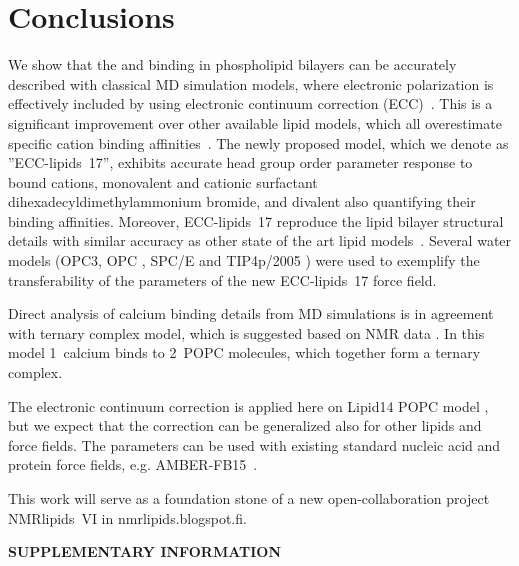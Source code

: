 \documentclass[aip,jcp,twocolumn]{revtex4}
\begin{document}
\section{Conclusions}
We show that the  and  binding in phospholipid bilayers can
be accurately described with classical MD simulation models, where electronic
polarization is effectively included by using electronic continuum correction (ECC)~\cite{leontyev11}.
This is a significant improvement over other available lipid models,
which all overestimate specific cation binding affinities~\cite{catte16}.  
The newly proposed model, which we denote as ''ECC-lipids~17'', 
exhibits accurate head group order parameter response to
bound cations, monovalent  and cationic surfactant dihexadecyldimethylammonium bromide, 
and divalent 
also quantifying their binding affinities.
Moreover, ECC-lipids~17 reproduce the lipid bilayer structural details
with similar accuracy as other state of the art lipid models~\cite{catte16}.
Several water models 
(OPC3\cite{Izadi16}, OPC \cite{Izadi14}, SPC/E \cite{Berendsen1987} and TIP4p/2005 \cite{Abascal2005}) 
were used to exemplify the transferability of 
the parameters of the new ECC-lipids~17 force field. 

Direct analysis of calcium binding details from MD simulations is in agreement
with ternary complex model, which is suggested based on NMR data \cite{altenbach84}.
In this model 1~calcium binds to 2~POPC molecules, which together form a ternary
complex.

The electronic continuum correction is applied here on Lipid14 POPC model \cite{dickson14},
but we expect that the correction can be generalized also for other lipids
and force fields.
The parameters can be used with existing standard nucleic acid and protein force fields, e.g. AMBER-FB15~\cite{Wang2017}. 


This work will serve as a foundation stone of a 
new open-collaboration project NMRlipids~VI in nmrlipids.blogspot.fi. 



\begin{acknowledgments}
\end{acknowledgments}
\newpage
\appendix
\begin{center}
{\bf SUPPLEMENTARY INFORMATION}
\end{center}





\listoftodos
\end{document}
